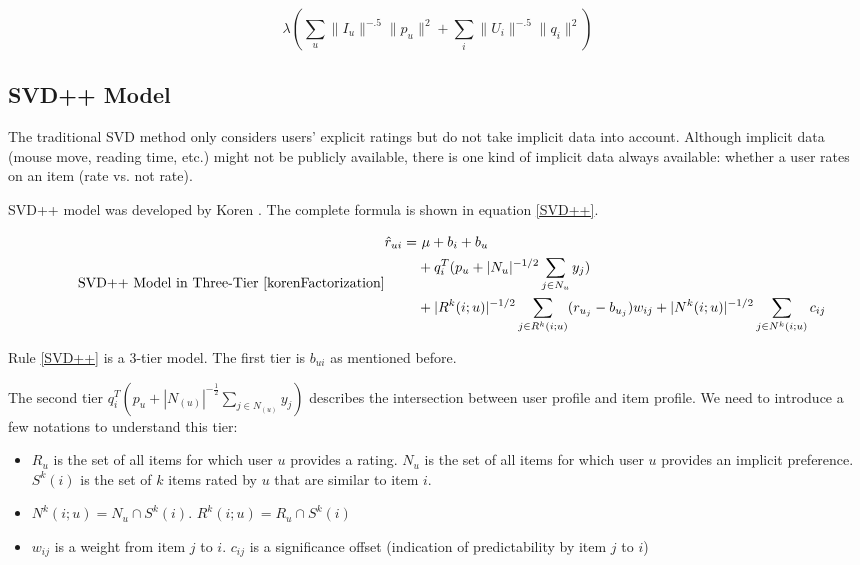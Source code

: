 \documentclass[letter paper, 11pt]{article}
\begin{document}
	\begin{equation}
		\label{eqn:modified-weighted-lambda}
		\lambda (\sum_u \|I_u\|^{-.5} \|p_u\|^2 + \sum_i \|U_i\|^{-.5} \|q_i\|^2)
	\end{equation}

	\subsection{SVD++ Model}
	
	The traditional SVD method only considers users' explicit ratings but do not take implicit data into account. Although implicit data (mouse move, reading time, etc.) might not be publicly available, there is one kind of implicit data always available: whether a user rates on an item (rate vs. not rate). 
	
	
	SVD++ model was developed by Koren \cite{korenFactorization}. The complete formula is shown in equation \ref{SVD++}. 
	
	\begin{equation} \label{SVD++}
		\tag*{SVD++ Model in Three-Tier \cite{korenFactorization}}
		\begin{split}
			\hat{r}_{ui} =& \ \mu + b_i + b_u \\ 
			& + q_i^T  (p_u + |N_u|^{-1/2} \sum_{j \in N_u}y_j) \\ 
			& + |R^k(i; u)|^{-1/2} \sum_{j \in R^k(i; u)} (r_{u_j} - b_{u_j}) w_{ij} + |N^k(i; u)|^{-1/2} \sum_{j \in N^k(i; u)} c_{ij}
		\end{split}
	\end{equation}
	
	
	Rule \ref{SVD++} is a 3-tier model. The first tier is $b_{ui}$ as mentioned before. 
	
	
	The second tier $q_i^T  (p_u + |N_{(u)}|^{-\frac{1}{2}} \sum_{j \in N_{(u)}}y_j)$ describes the intersection between user profile and item profile. We need to introduce a few notations to understand this tier:
	\begin{itemize}
		\item $R_u$ is the set of all items for which user $u$ provides a rating. $N_u$ is the set of all items for which user $u$ provides an implicit preference. $S^k(i)$ is the set of $k$ items rated by $u$ that are similar to item $i$.
		
		\item $N^k{(i; u)} = N_u \cap S^k (i)$. $R^k{(i; u)} = R_u \cap S^k (i)$
		
		\item $w_{ij}$ is a weight from item $j$ to $i$. $c_{ij}$ is a significance offset (indication of predictability by item $j$ to $i$)
	\end{itemize}
	
\end{document}
